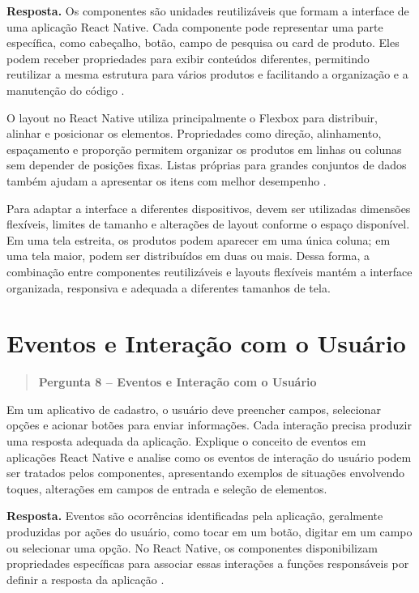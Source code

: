 \documentclass[
    12pt,
    oneside,
    a4paper,
    brazil
]{abntex2}
\newcommand{\pergunta}[2]{%
\begin{quote}
\noindent\textbf{Pergunta #1 -- #2}
\end{quote}}
\newcommand{\resposta}{%
\par\noindent\textbf{Resposta.}\hspace{0.3em}
}
\begin{document}
\resposta Os componentes são unidades reutilizáveis que formam a interface de uma aplicação React Native. Cada componente pode representar uma parte específica, como cabeçalho, botão, campo de pesquisa ou card de produto. Eles podem receber propriedades para exibir conteúdos diferentes, permitindo reutilizar a mesma estrutura para vários produtos e facilitando a organização e a manutenção do código \cite{reactNativeComponents}.

O layout no React Native utiliza principalmente o Flexbox para distribuir, alinhar e posicionar os elementos. Propriedades como direção, alinhamento, espaçamento e proporção permitem organizar os produtos em linhas ou colunas sem depender de posições fixas. Listas próprias para grandes conjuntos de dados também ajudam a apresentar os itens com melhor desempenho \cite{reactNativeFlexbox,reactNativeFlatList}.

Para adaptar a interface a diferentes dispositivos, devem ser utilizadas dimensões flexíveis, limites de tamanho e alterações de layout conforme o espaço disponível. Em uma tela estreita, os produtos podem aparecer em uma única coluna; em uma tela maior, podem ser distribuídos em duas ou mais. Dessa forma, a combinação entre componentes reutilizáveis e layouts flexíveis mantém a interface organizada, responsiva e adequada a diferentes tamanhos de tela.


\section{Eventos e Interação com o Usuário}
\pergunta{8}{Eventos e Interação com o Usuário}

Em um aplicativo de cadastro, o usuário deve preencher campos, selecionar opções e acionar botões para enviar informações. Cada interação precisa produzir uma resposta adequada da aplicação. Explique o conceito de eventos em aplicações React Native e analise como os eventos de interação do usuário podem ser tratados pelos componentes, apresentando exemplos de situações envolvendo toques, alterações em campos de entrada e seleção de elementos.

\resposta Eventos são ocorrências identificadas pela aplicação, geralmente produzidas por ações do usuário, como tocar em um botão, digitar em um campo ou selecionar uma opção. No React Native, os componentes disponibilizam propriedades específicas para associar essas interações a funções responsáveis por definir a resposta da aplicação \cite{reactNativeTextInput,reactNativePressable}.
\end{document}
